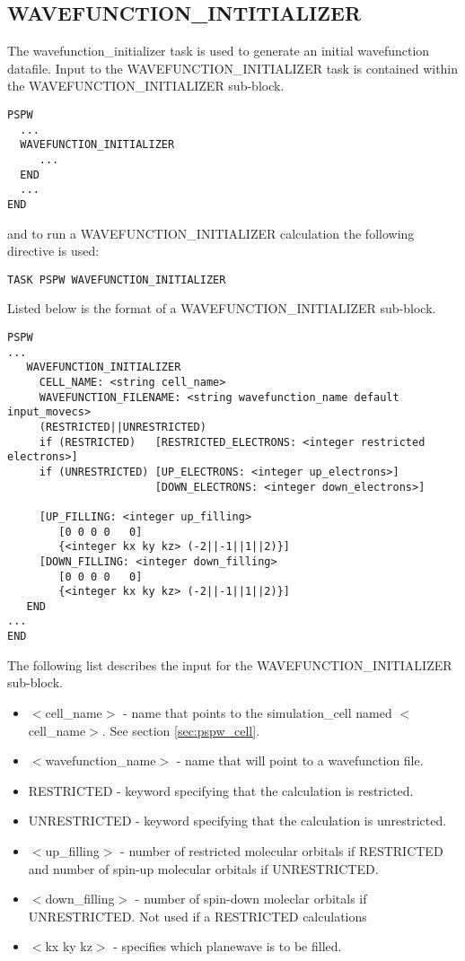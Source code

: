 \subsection{WAVEFUNCTION\_INTITIALIZER}
The wavefunction\_initializer task is used to generate an initial wavefunction
datafile.
Input to the WAVEFUNCTION\_INITIALIZER task is contained
within the WAVEFUNCTION\_INITIALIZER sub-block.
\begin{verbatim}
PSPW
  ...
  WAVEFUNCTION_INITIALIZER
     ...
  END
  ...
END
\end{verbatim}
and to run a WAVEFUNCTION\_INITIALIZER calculation the following directive 
is used:
\begin{verbatim}
TASK PSPW WAVEFUNCTION_INITIALIZER
\end{verbatim}
Listed below is the format of a WAVEFUNCTION\_INITIALIZER sub-block.
\begin{verbatim}
PSPW
... 
   WAVEFUNCTION_INITIALIZER
     CELL_NAME: <string cell_name>
     WAVEFUNCTION_FILENAME: <string wavefunction_name default input_movecs>
     (RESTRICTED||UNRESTRICTED)
     if (RESTRICTED)   [RESTRICTED_ELECTRONS: <integer restricted electrons>]
     if (UNRESTRICTED) [UP_ELECTRONS: <integer up_electrons>]
                       [DOWN_ELECTRONS: <integer down_electrons>]
     
     [UP_FILLING: <integer up_filling>
        [0 0 0 0   0]
        {<integer kx ky kz> (-2||-1||1||2)}]
     [DOWN_FILLING: <integer down_filling>
        [0 0 0 0   0]
        {<integer kx ky kz> (-2||-1||1||2)}]
   END
...
END
\end{verbatim}
The following list describes the input for the WAVEFUNCTION\_INITIALIZER
sub-block.
\begin{itemize}
        \item $<$cell\_name$>$ - name that points 
                to the simulation\_cell named $<$cell\_name$>$.  See section \ref{sec:pspw_cell}.
        \item $<$wavefunction\_name$>$ - name that will point
              to a wavefunction file.
        \item RESTRICTED - keyword specifying that the calculation is restricted.
        \item UNRESTRICTED - keyword specifying that the calculation is unrestricted.
        \item $<$up\_filling$>$ - number of restricted molecular orbitals if
              RESTRICTED and number of spin-up molecular orbitals if 
              UNRESTRICTED.
        \item $<$down\_filling$>$ - number of spin-down moleclar orbitals if
              UNRESTRICTED.  Not used if a RESTRICTED calculations
        \item $<$kx ky kz$>$ - specifies which planewave is to be filled. 
\end{itemize}



